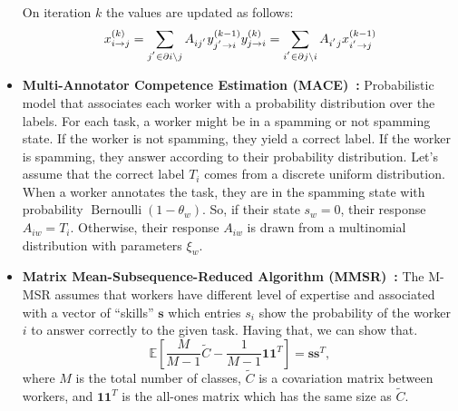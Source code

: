 \begin{itemize}
        On iteration $k$ the values are updated as follows:
        \begin{equation}
        x_{i \rightarrow j}^{(k)} = \sum_{j^{'} \in \partial i \backslash j} A_{ij^{'}} y_{j^{'} \rightarrow i}^{(k-1)} \\
        y_{j \rightarrow i}^{(k)} = \sum_{i^{'} \in \partial j \backslash i} A_{i^{'}j} x_{i^{'} \rightarrow j}^{(k-1)}
        \end{equation}
    \item \textbf{Multi-Annotator Competence Estimation (MACE)~\cite{hovy_MACE_2013}:}
            Probabilistic model that associates each worker with a probability distribution over the labels. For each task, a worker might be in a spamming or not spamming state. If the worker is not spamming, they yield a correct label. If the worker is spamming, they answer according to their probability distribution. Let's assume that the correct label $T_i$ comes from a discrete uniform distribution. When a worker annotates the task, they are in the spamming state with probability $\operatorname{Bernoulli}(1 - \theta_w)$. So, if their state $s_w = 0$, their response $A_{iw} = T_i$. Otherwise, their response $A_{iw}$ is drawn from a multinomial distribution with parameters $\xi_w$.
    \item \textbf{Matrix Mean-Subsequence-Reduced Algorithm (MMSR)~\cite{ma_Adversarial_2020}:}
            The M-MSR assumes that workers have different level of expertise and associated            with a vector of ``skills'' $\boldsymbol{s}$ which entries $s_i$ show the probability of the worker $i$ to answer correctly to the given task. Having that, we can show that.
            \begin{equation}
                \mathbb{E}\left[\frac{M}{M-1}\widetilde{C}-\frac{1}{M-1}\boldsymbol{1}\boldsymbol{1}^T\right]
                = \boldsymbol{s}\boldsymbol{s}^T,
            \end{equation}
            where $M$ is the total number of classes, $\widetilde{C}$ is a covariation matrix between
            workers, and $\boldsymbol{1}\boldsymbol{1}^T$ is the all-ones matrix which has the same
            size as $\widetilde{C}$.


\end{itemize}
